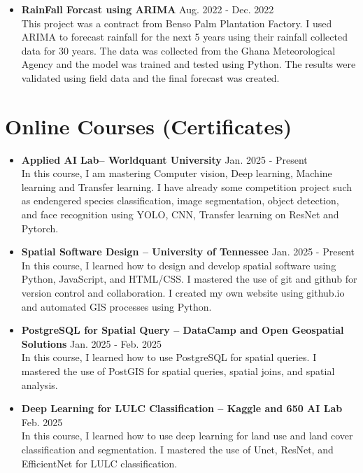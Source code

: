 \documentclass[a4paper,10pt]{article}
\begin{document}
\begin{itemize}[leftmargin=*]
    \item \textbf{RainFall Forcast using ARIMA} \hfill Aug. 2022 {-} Dec. 2022 \\
    This project was a contract from Benso Palm Plantation Factory. I used ARIMA to forecast rainfall for the next 5 years using their rainfall collected data for 30 years. The data was collected from the Ghana Meteorological Agency and
    the model was trained and tested using Python. The results were validated using field data and the final forecast was created.
\end{itemize}

\section*{Online Courses (Certificates)}
\begin{itemize}[leftmargin=*]
    \item \textbf{Applied AI Lab– Worldquant University} \hfill Jan. 2025 {-} Present\\
    In this course, I am mastering Computer vision, Deep learning, Machine learning and Transfer learning. I have already some competition project such as endengered species classification, 
    image segmentation, object detection, and face recognition using YOLO, CNN, Transfer learning on ResNet and Pytorch.

    \item \textbf{Spatial Software Design – University of Tennessee}  \hfill Jan. 2025 {-} Present\\
    In this course, I learned how to design and develop spatial software using Python, JavaScript, and HTML/CSS. I mastered the use of git and github for version control and collaboration. 
    I created my own website using github.io and automated GIS processes using Python.

    \item \textbf{PostgreSQL for Spatial Query – DataCamp and Open Geospatial Solutions} \hfill Jan. 2025 {-} Feb. 2025\\
    In this course, I learned how to use PostgreSQL for spatial queries. I mastered the use of PostGIS for spatial queries, spatial joins, and spatial analysis.

    \item \textbf{Deep Learning for LULC Classification – Kaggle and 650 AI Lab} \hfill Feb. 2025 \\
    In this course, I learned how to use deep learning for land use and land cover classification and segmentation. 
    I mastered the use of Unet, ResNet, and EfficientNet for LULC classification.


\end{itemize}
\end{document}
